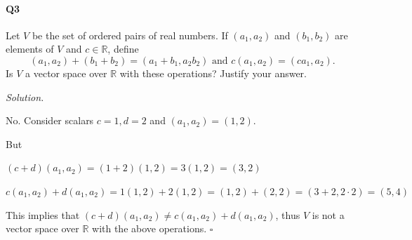 \documentclass{report}
\begin{document}
\paragraph{Q3} Let $V$ be the set of ordered pairs of real numbers. If $(a_1, a_2)$ and $(b_1, b_2)$ are elements of $V$ and $c \in \mathbb{R}$, define
\[ (a_1, a_2) + (b_1 + b_2) = (a_1 + b_1, a_2b_2) \text{ and } c(a_1, a_2) = (ca_1, a_2).\]
Is $V$ a vector space over $\mathbb{R}$ with these operations? Justify your answer.

\bigskip \noindent
\textit{Solution.} \smallskip

No. Consider scalars $c = 1, d = 2$ and $(a_1, a_2) = (1, 2)$.
\smallskip

But

$(c+d)(a_1,a_2) = (1+2)(1,2) = 3(1,2) = (3,2)$

$c(a_1,a_2) + d(a_1,a_2) = 1(1,2) + 2(1,2) = (1,2) + (2,2) = (3+2,2 \cdot 2) = (5, 4)$

\medskip

This implies that $(c+d)(a_1, a_2) \neq c(a_1, a_2) + d(a_1, a_2)$, thus $V$ is not a vector space over $\mathbb{R}$ with the above operations. \hfill $\square$
\end{document}
